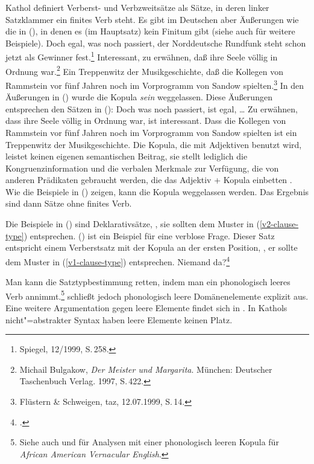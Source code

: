 Kathol definiert Verberst- und Verbzweitsätze als Sätze, in deren linker Satzklammer
ein finites Verb steht. Es gibt im Deutschen aber Äußerungen wie die in (),
in denen es (im Hauptsatz) kein Finitum gibt (siehe auch  für weitere
Beispiele).
\eal
\ex Doch egal,      was  noch  passiert, der Norddeutsche Rundfunk             steht  schon   jetzt als Gewinner fest.\footnote{
        Spiegel, 12/1999, S.\,258.
}
\ex Interessant, zu erwähnen, daß ihre Seele völlig    in Ordnung war.\footnote{
        Michail Bulgakow, \emph{Der Meister und Margarita}. München: Deutscher Taschenbuch Verlag. 1997, S.\,422.
      }
\ex Ein Treppenwitz der    Musikgeschichte, daß die Kollegen   von Rammstein vor    fünf Jahren noch im      Vorprogramm   von Sandow spielten.\footnote{
        Flüstern \& Schweigen, taz, 12.07.1999, S.\,14. %
}
\zl
In den Äußerungen in () wurde die Kopula \emph{sein} weggelassen.
Diese Äußerungen entsprechen den Sätzen in ():
\eal
\ex Doch was noch passiert, ist egal, \ldots
\ex Zu erwähnen, dass ihre Seele völlig in Ordnung war, ist interessant.
\ex Dass die Kollegen von Rammstein vor fünf Jahren noch im Vorprogramm von Sandow spielten ist ein Treppenwitz der Musikgeschichte.
\zl
Die Kopula, die mit Adjektiven benutzt wird, leistet keinen eigenen semantischen Beitrag,
sie stellt lediglich die Kongruenzinformation und die verbalen Merkmale zur Verfügung, die von anderen Prädikaten
gebraucht werden, die das Adjektiv + Kopula einbetten \citep[]{Paul1919a}.
Wie die Beispiele in () zeigen, kann die Kopula weggelassen werden. Das Ergebnis sind dann
Sätze ohne finites Verb.

Die Beispiele in () sind Deklarativsätze, \dash, sie sollten dem Muster in
(\ref{v2-clause-type}) entsprechen. () ist ein Beispiel für eine verblose Frage.
Dieser Satz entspricht einem Verberstsatz mit der Kopula an der ersten Position,
\dash, er sollte dem Muster in (\ref{v1-clause-type}) entsprechen.
\ea
Niemand da?\footnote{
        .
}
\z

\noindent
Man kann die Satztypbestimmung retten, indem man ein phonologisch leeres Verb annimmt.\footnote{
  Siehe auch  und  für Analysen
  mit einer phonologisch leeren Kopula für \emph{African American Vernacular English}.%
}
 schließt jedoch phonologisch leere Domänenelemente explizit aus.
Eine weitere Argumentation gegen leere Elemente findet sich in .
In Kathols nicht"=abstrakter Syntax haben leere Elemente keinen Platz.

